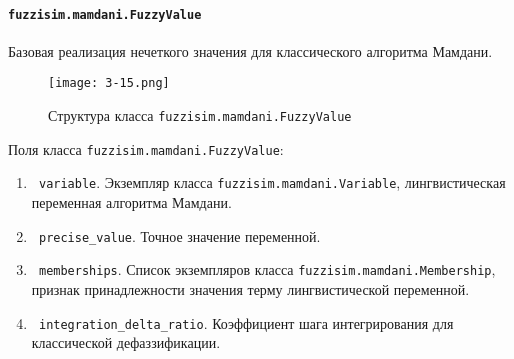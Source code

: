 \paragraph{\lstinline!fuzzisim.mamdani.FuzzyValue!}

Базовая реализация нечеткого значения для классического алгоритма Мамдани.

\begin{figure}[ht]
	\centering
	\texttt{[image: 3-15.png]}
	\caption{ Структура класса \lstinline!fuzzisim.mamdani.FuzzyValue!}
\end{figure}

Поля класса \lstinline!fuzzisim.mamdani.FuzzyValue!:
\begin{enumerate}[label=\arabic*)]
	\item \lstinline! variable!. Экземпляр класса  \lstinline!fuzzisim.mamdani.Variable!, лингвистическая переменная алгоритма Мамдани.
	\item \lstinline! precise_value!.   Точное значение переменной.
	\item \lstinline! memberships!. Список экземпляров класса   \lstinline!fuzzisim.mamdani.Membership!, признак принадлежности значения терму лингвистической переменной.
	\item \lstinline! integration_delta_ratio!.   Коэффициент шага интегрирования для классической дефаззификации.
\end{enumerate}



